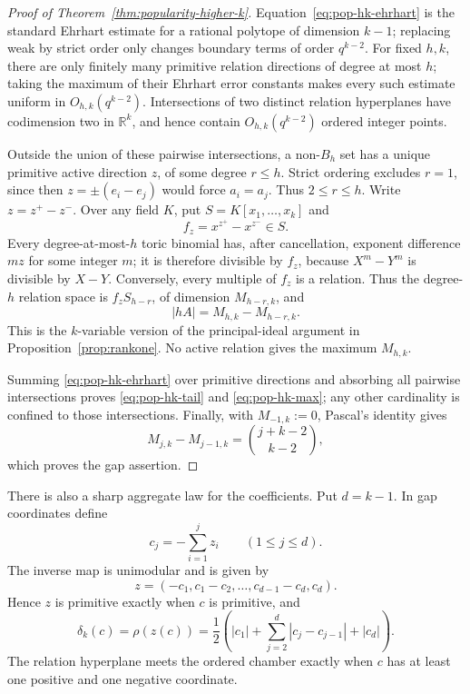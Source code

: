 \documentclass[11pt,reqno]{amsart}
\theoremstyle{definition}
\theoremstyle{remark}
\begin{document}
\begin{proof}[Proof of Theorem~\ref{thm:popularity-higher-k}]
Equation~\eqref{eq:pop-hk-ehrhart} is the standard Ehrhart estimate for a
rational polytope of dimension $k-1$; replacing weak by strict order only
changes boundary terms of order $q^{k-2}$.  For fixed $h,k$, there are only
finitely many primitive relation directions of degree at most $h$; taking
the maximum of their Ehrhart error constants makes every such estimate
uniform in $O_{h,k}(q^{k-2})$.
Intersections of two distinct relation hyperplanes have codimension two in
$\mathbb R^k$, and hence contain $O_{h,k}(q^{k-2})$ ordered integer points.

Outside the union of these pairwise intersections, a non-$B_h$ set has a
unique primitive active direction $z$, of some degree $r\leq h$.
Strict ordering excludes $r=1$, since then
$z=\pm(e_i-e_j)$ would force $a_i=a_j$.  Thus $2\leq r\leq h$.
Write $z=z^+-z^-$.  Over any field $K$, put $S=K[x_1,\ldots,x_k]$ and
\[
 f_z=x^{z^+}-x^{z^-}\in
 S.
\]
Every degree-at-most-$h$ toric binomial has, after cancellation, exponent
difference $mz$ for some integer $m$; it is therefore divisible by $f_z$,
because $X^m-Y^m$ is divisible by $X-Y$.  Conversely, every multiple of
$f_z$ is a relation.  Thus the degree-$h$ relation space is
$f_zS_{h-r}$, of dimension $M_{h-r,k}$, and
\[
 |hA|=M_{h,k}-M_{h-r,k}.
\]
This is the $k$-variable version of the principal-ideal argument in
Proposition~\ref{prop:rankone}.  No active relation gives the maximum
$M_{h,k}$.

Summing \eqref{eq:pop-hk-ehrhart} over primitive directions and absorbing
all pairwise intersections proves \eqref{eq:pop-hk-tail} and
\eqref{eq:pop-hk-max}; any other cardinality is confined to those
intersections.  Finally, with $M_{-1,k}:=0$, Pascal's identity gives
\[
 M_{j,k}-M_{j-1,k}=\binom{j+k-2}{k-2},
\]
which proves the gap assertion.
\end{proof}

There is also a sharp aggregate law for the coefficients.  Put
$d=k-1$.  In gap coordinates define
\[
 c_j=-\sum_{i=1}^jz_i\qquad(1\leq j\leq d).
\]
The inverse map is unimodular and is given by
\[
 z=(-c_1,c_1-c_2,\ldots,c_{d-1}-c_d,c_d).
\]
Hence $z$ is primitive exactly when $c$ is primitive, and
\begin{equation}\label{eq:pop-hk-gapdegree}
 \delta_k(c)=\rho(z(c))=
 \frac12\left(
 |c_1|+\sum_{j=2}^{d}|c_j-c_{j-1}|+|c_d|
 \right).
\end{equation}
The relation hyperplane meets the ordered chamber exactly when $c$ has at
least one positive and one negative coordinate.
\end{document}
